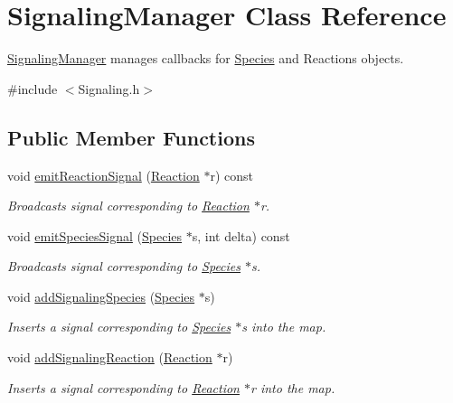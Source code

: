 \hypertarget{classSignalingManager}{\section{Signaling\-Manager Class Reference}
\label{classSignalingManager}
}


\hyperlink{classSignalingManager}{Signaling\-Manager} manages callbacks for \hyperlink{classSpecies}{Species} and Reactions objects.  




{\ttfamily \#include $<$Signaling.\-h$>$}

\subsection*{Public Member Functions}
\begin{DoxyCompactItemize}
\item 
void \hyperlink{classSignalingManager_a20940794f6e6e8ddfb78c3fe7d030eb7}{emit\-Reaction\-Signal} (\hyperlink{classReaction}{Reaction} $\ast$r) const 
\begin{DoxyCompactList}\small\item\em Broadcasts signal corresponding to \hyperlink{classReaction}{Reaction} $\ast$r. \end{DoxyCompactList}\item 
void \hyperlink{classSignalingManager_a54275286426f134a9d8e8f0b53b51b98}{emit\-Species\-Signal} (\hyperlink{classSpecies}{Species} $\ast$s, int delta) const 
\begin{DoxyCompactList}\small\item\em Broadcasts signal corresponding to \hyperlink{classSpecies}{Species} $\ast$s. \end{DoxyCompactList}\item 
void \hyperlink{classSignalingManager_ae159a4625a5cb3dd1f8bbb620e4d3239}{add\-Signaling\-Species} (\hyperlink{classSpecies}{Species} $\ast$s)
\begin{DoxyCompactList}\small\item\em Inserts a signal corresponding to \hyperlink{classSpecies}{Species} $\ast$s into the map. \end{DoxyCompactList}\item 
void \hyperlink{classSignalingManager_ab73dca10c163ba44ec6c7bddcb021dd2}{add\-Signaling\-Reaction} (\hyperlink{classReaction}{Reaction} $\ast$r)
\begin{DoxyCompactList}\small\item\em Inserts a signal corresponding to \hyperlink{classReaction}{Reaction} $\ast$r into the map. \end{DoxyCompactList}\item 

\end{DoxyCompactItemize}
